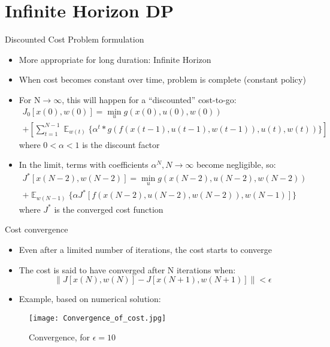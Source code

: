 \documentclass{beamer}
\DeclareMathOperator{\E}{\mathbb{E}}
\newcommand{\norm}[1]{\left\lVert#1\right\rVert}
\begin{document}
\section{Infinite Horizon DP}
\begin{frame}{Discounted Cost Problem formulation}
\begin{itemize}
\item More appropriate for long duration: Infinite Horizon
\item When cost becomes constant over time, problem is complete (constant policy)
\item For N$\to\infty$, this will happen for a “discounted” cost-to-go:
\begin{multline}
J_{0}[x(0),w(0)]=\min_{u} g(x(0),u(0),w(0))\\
+\left[\sum_{t=1}^{N-1}\mathop{\E}_{w(t)} \{
\alpha^{t}*g( f(x(t-1),u(t-1),w(t-1)) ,u(t),w(t))
\}\right]
\end{multline}
where $0<\alpha<1$ is the discount factor
\item In the limit, terms with coefficients $\alpha^{N},N\to\infty$ become negligible, so:
\begin{multline}
J^{*}[x(N-2),w(N-2)]=\min_{u} g(x(N-2),u(N-2),w(N-2))\\
+\mathop{\E}_{w(N-1)} \{\alpha J^{*}[f(x(N-2),u(N-2),w(N-2)),w(N-1)]
\}
\end{multline}
where $J^{*}$ is the converged cost function
\end{itemize}
\end{frame}

\begin{frame}{Cost convergence}
\begin{itemize}
\item Even after a limited number of iterations, the cost starts to converge
\item The cost is said to have converged after N iterations when:
\begin{equation}
\norm{J[x(N),w(N)]-J[x(N+1),w(N+1)]} < \epsilon
\end{equation}
\item Example, based on numerical solution:
\end{itemize}
\begin{figure}
\texttt{[image: Convergence\_of\_cost.jpg]}
\caption{Convergence, for $\epsilon=10$}
\end{figure}
\end{frame}
\end{document}
